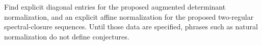 \begin{problem}
\label{prob:leg2-normalizations}
Find explicit diagonal entries for the proposed augmented determinant
normalization, and an explicit affine normalization for the proposed
two-regular spectral-closure sequences.  Until those data are specified,
phrases such as natural normalization do not define conjectures.
\end{problem}
